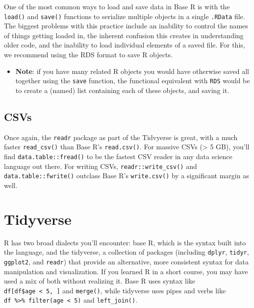 \documentclass[
]{book}
\providecommand{\tightlist}{%
  \setlength{\itemsep}{0pt}\setlength{\parskip}{0pt}}
\begin{document}
One of the most common ways to load and save data in Base R is with the \texttt{load()} and \texttt{save()} functions to serialize multiple objects in a single \texttt{.RData} file. The biggest problems with this practice include an inability to control the names of things getting loaded in, the inherent confusion this creates in understanding older code, and the inability to load individual elements of a saved file. For this, we recommend using the RDS format to save R objects.

\begin{itemize}
\tightlist
\item
  \textbf{Note}: if you have many related R objects you would have otherwise saved all together using the \texttt{save} function, the functional equivalent with \texttt{RDS} would be to create a (named) list containing each of these objects, and saving it.
\end{itemize}

\subsection{CSVs}\label{csvs}

Once again, the \texttt{readr} package as part of the Tidvyerse is great, with a much faster \texttt{read\_csv()} than Base R's \texttt{read.csv()}. For massive CSVs (\textgreater{} 5 GB), you'll find \texttt{data.table::fread()} to be the fastest CSV reader in any data science language out there. For writing CSVs, \texttt{readr::write\_csv()} and \texttt{data.table::fwrite()} outclass Base R's \texttt{write.csv()} by a significant margin as well.

\section{Tidyverse}\label{tidyverse}

R has two broad dialects you'll encounter: base R, which is the syntax built into the language, and the tidyverse, a collection of packages (including \texttt{dplyr}, \texttt{tidyr}, \texttt{ggplot2}, and \texttt{readr}) that provide an alternative, more consistent syntax for data manipulation and visualization. If you learned R in a short course, you may have used a mix of both without realizing it. Base R uses syntax like \texttt{df{[}df\$age\ \textless{}\ 5,\ {]}} and \texttt{merge()}, while tidyverse uses pipes and verbs like \texttt{df\ \%\textgreater{}\%\ filter(age\ \textless{}\ 5)} and \texttt{left\_join()}.
\end{document}
